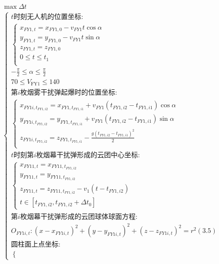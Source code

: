 \documentclass[../main.tex]{subfiles}
\begin{document}
\begin{align}
  \begin{array}{c}
	 \max \Delta t
  \\
\left\{ \begin{array}{l}
	t\text{时刻无人机的位置坐标:}\\
	\left\{ \begin{array}{l}
	x_{FY1,t}=x_{FY1,0}-v_{FY1}t\cos \alpha \\
	y_{FY1,t}=y_{FY1,0}-v_{FY1}t\sin \alpha \\
	z_{FY1,t}=z_{FY1,0}\\
  0\leq t\leq t_1\\
\end{array} \right.\\
	-\frac{\pi}{2}\leq \alpha  \leq \frac{\pi}{2}\\
  70 \leq V_{\text{FY1}} \leq 140\\
	\text{第$i$枚烟雾干扰弹起爆时的位置坐标:}\\
	\left\{ \begin{array}{l}
	x_{FY1i,t_{FY1,i2}}=x_{FY1,t_{FY1,i1}}+v_{FY1}\left( t_{FY1,i2}-t_{FY1,i1} \right) \cos \alpha\\
	y_{FY1i,t_{FY1,i2}}=y_{FY1,t_{FY1,i1}}+v_{FY1}\left( t_{FY1,i2}-t_{FY1,i1} \right) \sin \alpha\\
	z_{FY1i,t_{FY1,i2}}=z_{FY1,t_{FY1,i1}}-\frac{g\left( t_{FY1,i2}-t_{FY1,i1} \right) ^2}{2}\\
\end{array} \right. \\
	t\text{时刻第$i$枚烟幕干扰弹形成的云团中心坐标:}\\
	\left\{ \begin{array}{l}
	x_{FY11,t}=x_{FY11,t_{FY1,i2}}\\
	y_{FY11,t}=y_{FY11,t_{FY1,i2}}\\
	z_{FY11,t}=z_{FY11,t_{FY1,i2}}-v_1\left( t-t_{FY1,i2} \right)\\
	t\in \left[ t_{FY1,i2},t_{FY1,i2}+\Delta t_0 \right]
\end{array} \right.\\
	\text{第$i$枚烟幕干扰弹形成的云团球体球面方程:}\\
	O_{FY1i,t}:\left( x-x_{FY1i,t} \right) ^2+\left( y-y_{FY1i,t} \right) ^2+\left( z-z_{FY1i,t} \right) ^2=r^2\left( 3.5 \right) 
	\\
	\text{圆柱面上点坐标:}\\
	\left\{ \begin{array}{c}
	\begin{array}{l}

\end{array}
\end{array}
\end{array}
\end{array}
\end{align}
\end{document}
